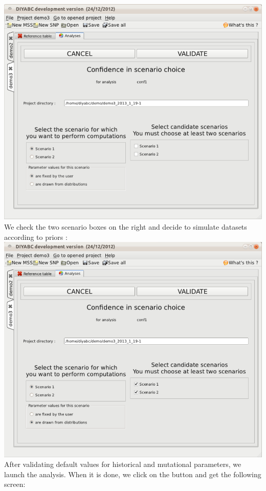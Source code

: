 \includegraphics[scale=0.33]{gui_pictures/Capture-DIYABC-116.png} \\

We check the two scenario boxes on the right and decide to simulate datasets according to priors :\\

\includegraphics[scale=0.38]{gui_pictures/Capture-DIYABC-117.png} \\

After validating default values for historical and mutational parameters, we launch the analysis. When it is done, we click on the  button and get the following screen:\\

